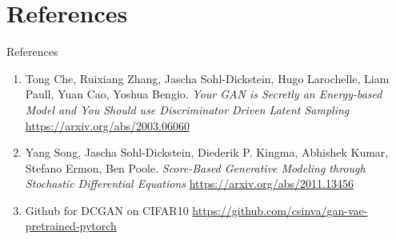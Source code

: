 \documentclass[xcolor=dvipsnames]{beamer}
\begin{document}
    \section{References}

    \begin{frame}{References}
        \begin{enumerate}
            \item\label{bib:energy-gan} Tong Che, Ruixiang Zhang, Jascha Sohl-Dickstein, Hugo Larochelle, Liam Paull, Yuan Cao, Yoshua Bengio. \textit{Your GAN is Secretly an Energy-based Model and You Should use Discriminator Driven Latent Sampling}  \url{https://arxiv.org/abs/2003.06060}
            \item\label{bib:reverse-sde} Yang Song, Jascha Sohl-Dickstein, Diederik P. Kingma, Abhishek Kumar, Stefano Ermon, Ben Poole. \textit{Score-Based Generative Modeling through Stochastic Differential Equations} \url{https://arxiv.org/abs/2011.13456}            
            \item Github for DCGAN on CIFAR10 \url{https://github.com/csinva/gan-vae-pretrained-pytorch}
        \end{enumerate}
    \end{frame}

    
\end{document}
